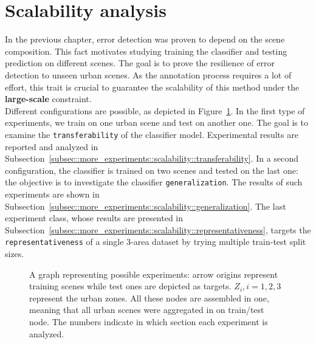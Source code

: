 \minitoc

\vfill

\clearpage

\section{Scalability analysis}
    \label{sec::more_experiments::scalability}
    In the previous chapter, error detection was proven to depend on the scene composition.
    This fact motivates studying training the classifier and testing prediction on different scenes.
    The goal is to prove the resilience of error detection to unseen urban scenes.
    As the annotation process requires a lot of effort, this trait is crucial to guarantee the scalability of this method under the \textbf{large-scale} constraint.\\

    Different configurations are possible, as depicted in Figure~\ref{fig::scalability_study}.
    In the first type of experiments, we train on one urban scene and test on another one.
    The goal is to examine the \texttt{transferability} of the classifier model.
    Experimental results are reported and analyzed in Subsection~\ref{subsec::more_experiments::scalability::transferability}.
    In a second configuration, the classifier is trained on two scenes and tested on the last one: the objective is to investigate the classifier \texttt{generalization}.
    The results of such experiments are shown in Subsection~\ref{subsec::more_experiments::scalability::generalization}.
    The last experiment class, whose results are presented in Subsection~\ref{subsec::more_experiments::scalability::representativeness}, targets the \texttt{representativeness} of a single 3-area dataset by trying multiple train-test split sizes.\\

    \begin{figure}[htbp]
        \ffigbox[\FBwidth]{
            
        }
        {
            \caption{
                \label{fig::scalability_study}
                A graph representing possible experiments: arrow origins represent training scenes while test ones are depicted as targets.
                \(Z_i, i=1,2,3\) represent the urban zones.
                All these nodes are assembled in one, meaning that all urban scenes were aggregated in on train/test node.
                The numbers indicate in which section each experiment is analyzed.
            }
        }
    \end{figure}

